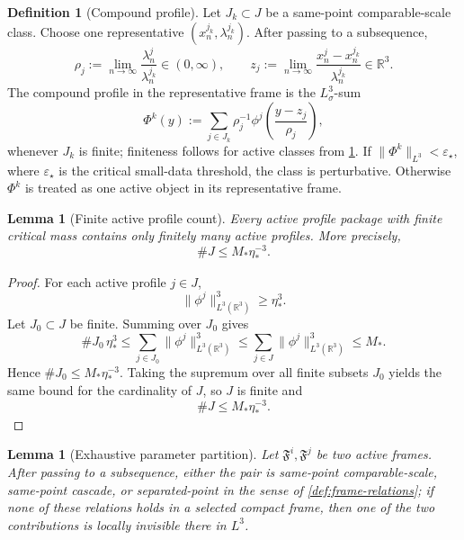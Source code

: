 \documentclass[11pt]{amsart}
\theoremstyle{plain}
\newtheorem{lemma}[theorem]{Lemma}
\theoremstyle{definition}
\newtheorem{definition}[theorem]{Definition}
\theoremstyle{remark}
\begin{document}
\begin{definition}[Compound profile]\label{def:compound-profile}
Let \(J_k\subset J\) be a same-point comparable-scale class.  Choose one
representative \((x_n^{j_k},\lambda_n^{j_k})\).  After passing to a subsequence,
\[
  \rho_j:=\lim_{n\to\infty}\frac{\lambda^j_n}{\lambda^{j_k}_n}\in(0,\infty),
  \qquad
  z_j:=\lim_{n\to\infty}\frac{x^j_n-x^{j_k}_n}{\lambda^{j_k}_n}\in\mathbb R^3 .
\]
The compound profile in the representative frame is the \(L^3_\sigma\)-sum
\[
  \Phi^k(y):=\sum_{j\in J_k}\rho_j^{-1}
  \phi^j\left(\frac{y-z_j}{\rho_j}\right),
\]
whenever \(J_k\) is finite; finiteness follows for active classes from
\cref{lem:finite-active-count}.  If \(\|\Phi^k\|_{L^3}<\varepsilon_\star\), where
\(\varepsilon_\star\) is the critical small-data threshold, the class is
perturbative.  Otherwise \(\Phi^k\) is treated as one active object in its
representative frame.
\end{definition}

\begin{lemma}[Finite active profile count]\label{lem:finite-active-count}
Every active profile package with finite critical mass contains only finitely many
active profiles.  More precisely,
\[
  \#J\le M_*\eta_*^{-3}.
\]
\end{lemma}

\begin{proof}
For each active profile $j\in J$,
\[
  \|\phi^j\|_{L^3(\mathbb R^3)}^3\ge\eta_*^3.
\]
Let $J_0\subset J$ be finite. Summing over $J_0$ gives
\[
  \#J_0\,\eta_*^3
  \le
  \sum_{j\in J_0}\|\phi^j\|_{L^3(\mathbb R^3)}^3
  \le
  \sum_{j\in J}\|\phi^j\|_{L^3(\mathbb R^3)}^3
  \le M_*.
\]
Hence $\#J_0\le M_*\eta_*^{-3}$.  Taking the supremum over all finite
subsets $J_0$ yields the same bound for the cardinality of $J$, so $J$ is finite
and
\[
  \#J\le M_*\eta_*^{-3}.
\]
\end{proof}

\begin{lemma}[Exhaustive parameter partition]\label{lem:parameter-partition}
Let \(\mathfrak F^i,\mathfrak F^j\) be two active frames.  After passing to a
subsequence, either the pair is same-point comparable-scale, same-point cascade,
or separated-point in the sense of \cref{def:frame-relations}; if none of these
relations holds in a selected compact frame, then one of the two contributions
is locally invisible there in \(L^3\).
\end{lemma}
\end{document}
